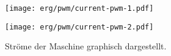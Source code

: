 \begin{figure}[h!]
	\begin{minipage}[t]{0.5\textwidth}
		\texttt{[image: erg/pwm/current-pwm-1.pdf]}
	\end{minipage}
	\begin{minipage}[t]{0.5\textwidth} 
		\texttt{[image: erg/pwm/current-pwm-2.pdf]}
	\end{minipage}
	\caption{Ströme der Maschine graphisch dargestellt.}
	\label{fig:idiq-pwm}
\end{figure}





